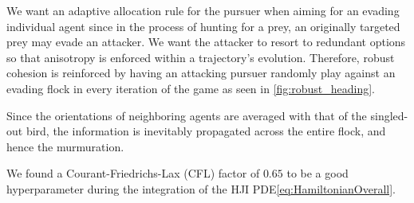 We want an adaptive allocation rule for the pursuer when aiming for an evading individual agent since in the process of hunting for a prey, an originally targeted prey may evade an attacker. We want the attacker to resort to redundant options so that anisotropy is enforced within a trajectory's evolution. Therefore, robust cohesion is reinforced by having an attacking  pursuer randomly play against an evading flock in every iteration of the game as seen in \autoref{fig:robust_heading}. 


Since the orientations of neighboring agents are averaged with that of the singled-out bird, the information is inevitably propagated across the entire flock, and hence the murmuration.
%

We found a Courant-Friedrichs-Lax (CFL) factor of $0.65$ to be a good hyperparameter during the integration of the HJI PDE\eqref{eq:HamiltonianOverall}.